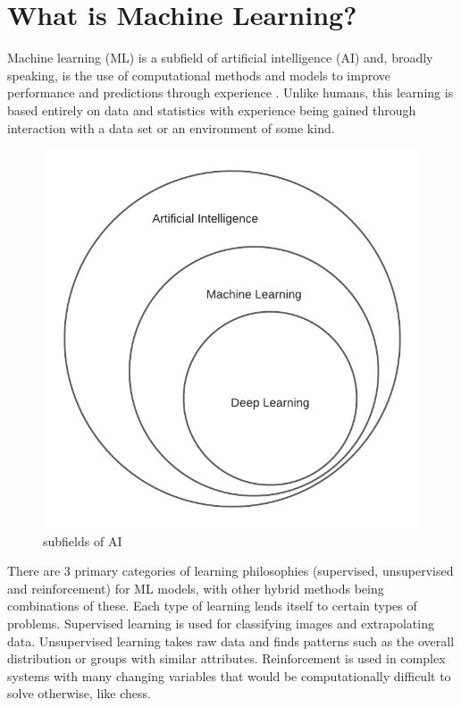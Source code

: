\documentclass[10pt,a4paper]{report}
\begin{document}
		\section{What is Machine Learning?}
			Machine learning (ML) is a subfield of artificial intelligence (AI) and,
			broadly speaking, is the use of computational methods and models to improve
			performance and predictions through experience \autocite[p. 1]{FoundationsOfMachineLearning}.
			Unlike humans, this learning is based entirely on data and statistics with
			experience being gained through interaction with a data set
			or an environment of some kind. \par
			\begin{figure}[h]
				\centering
				\includegraphics[scale=0.8]{ai-fields-euler-diagram.png}
				\caption{subfields of AI}
				\label{fig:ai-subfields}
			\end{figure}
			There are 3 primary categories of learning philosophies (supervised, unsupervised and reinforcement) for ML models,
			with other hybrid methods being combinations of these. Each type of learning lends itself to certain types of problems.
			Supervised learning is used for classifying images and extrapolating data. Unsupervised learning
			takes raw data and finds patterns such as the overall distribution or groups with similar attributes. Reinforcement is used in complex
			systems with many changing variables that would be computationally difficult to solve otherwise, like chess.
\end{document}
